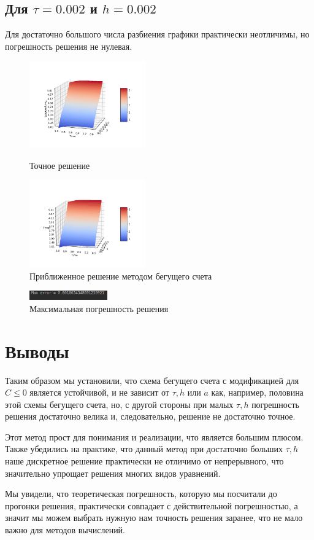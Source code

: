 \documentclass[12pt,a4paper]{scrartcl}
\begin{document}
\subsection{Для $\tau = 0.002$ и $h = 0.002$}
Для достаточно большого числа разбиения графики практически неотличимы, но погрешность решения не нулевая.

\begin{figure}[h]
	\begin{multicols}{2}
		\hfill
		\includegraphics[width=50mm]{convect_equation/img/mainFunc500-500.png}
		\hfill
		\caption{Точное решение}
		\hfill
		\includegraphics[width=50mm]{convect_equation/img/result500-500.png}
		\hfill
		\caption{Приближенное решение методом бегущего счета}
	\end{multicols}
\end{figure}

\begin{figure}[h]
	\centering
	\includegraphics[width=0.3\textwidth]{convect_equation/img/MaxError500-500.png}
	\caption{Максимальная погрешность решения}
\end{figure}

\newpage
\section{Выводы}

Таким образом мы установили, что схема бегущего счета с модификацией для $C \le 0$ является устойчивой, и не зависит от $\tau,h$ или $a$ как, например, половина этой схемы бегущего счета, но, с другой стороны при малых $\tau, h$ погрешность решения достаточно велика и, следовательно, решение не достаточно точное.
	
Этот метод прост для понимания и реализации, что является большим плюсом. Также убедились на практике, что данный метод при достаточно больших $\tau, h$ наше дискретное решение практически не отличимо от непрерывного, что значительно упрощает решения многих видов уравнений.
	
Мы увидели, что теоретическая погрешность, которую мы посчитали до прогонки решения, практически совпадает с действительной погрешностью, а значит мы можем выбрать нужную нам точность решения заранее, что не мало важно для методов вычислений.
\end{document}
